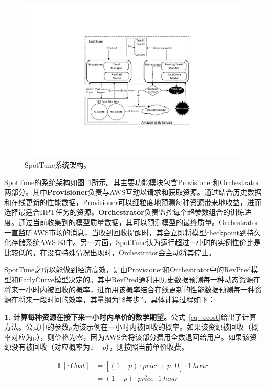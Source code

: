 \begin{figure}[h]
    \centerline{\includegraphics[width=\textwidth]{figures/arch_spottune.pdf}}
    \caption{SpotTune系统架构。}
    \label{arch_spottune}
\end{figure}

SpotTune的系统架构如图~\ref{arch_spottune}所示。其主要功能模块包含Provisioner和Orchestrator两部分。其中\textbf{Provisioner}负责与AWS互动以请求和获取资源。通过结合历史数据和在线更新的性能数据，Provisioner可以细粒度地预测每种资源带来地收益，进而选择最适合HPT任务的资源。\textbf{Orchestrator}负责监控每个超参数组合的训练进度。通过当前收集到的模型质量数据，其可以预测模型的最终质量。Orchestrator一直监听AWS市场的消息，当收到回收提醒时，其会立即将模型checkpoint到持久化存储系统AWS S3中。另一方面，SpotTune认为运行超过一小时的实例性价比是比较低的，在没有特殊情况出现时，Orchestrator会主动将其停止。

SpotTune之所以能做到经济高效，是由Provisioner和Orchestrator中的RevPred模型和EarlyCurve模型决定的。其中RevPred通利用历史数据预测每一种动态资源在将来一小时内被回收的概率，进而用该概率结合在线更新的性能数据预测每一种资源在将来一段时间的效率，其量纲为“\$每步”。具体计算过程如下：

\textbf{1. 计算每种资源在接下来一小时内单价的数学期望。}公式~\ref{eq_ecost}给出了计算方法。公式中的参数$p$为该示例在一小时内被回收的概率。如果该资源被回收（概率对应为p），则价格为零，因为AWS会将该部分费用全数退回给用户。如果该资源没有被回收（对应概率为$1-p$），则按照当前单价收费。

\begin{equation}\label{eq_ecost}
	\begin{aligned}
		\mathbb{E}\left[eCost\right] &= [(1-p) \cdot \overline{price} + p \cdot 0] \cdot 1\ hour \\
		&= (1-p) \cdot \overline{price} \cdot 1\ hour
	\end{aligned}
\end{equation}


